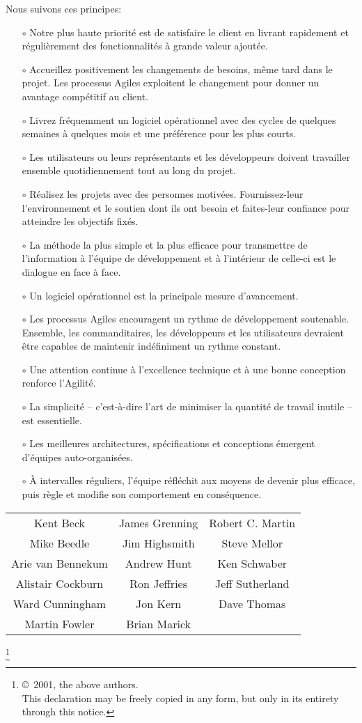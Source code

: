 \documentclass[11pt,a4paper]{article}
\newcommand\blfootnote[1]{%
  \begingroup
  \renewcommand\thefootnote{}\footnote{#1}%
  \addtocounter{footnote}{-1}%
  \endgroup
}
\begin{document}
Nous suivons ces principes:
\begin{itemize}
\item[$\circ$] Notre plus haute priorité est de satisfaire le client
en livrant rapidement et régulièrement des fonctionnalités
à grande valeur ajoutée.
\item[$\circ$] Accueillez positivement les changements de besoins,
même tard dans le projet. Les processus Agiles
exploitent le changement pour donner un avantage
compétitif au client.
\item[$\circ$] Livrez fréquemment un logiciel opérationnel avec des
cycles de quelques semaines à quelques mois et une
préférence pour les plus courts.
\item[$\circ$] Les utilisateurs ou leurs représentants et les
développeurs doivent travailler ensemble quotidiennement
tout au long du projet.
\item[$\circ$] Réalisez les projets avec des personnes motivées.
Fournissez-leur l’environnement et le soutien dont ils
ont besoin et faites-leur confiance pour atteindre les
objectifs fixés.
\item[$\circ$] La méthode la plus simple et la plus efficace pour
transmettre de l’information à l'équipe de développement
et à l’intérieur de celle-ci est le dialogue en face à face.
\item[$\circ$] Un logiciel opérationnel est la principale mesure d’avancement.
\item[$\circ$] Les processus Agiles encouragent un rythme de développement
soutenable. Ensemble, les commanditaires, les développeurs
et les utilisateurs devraient être capables de maintenir
indéfiniment un rythme constant.
\item[$\circ$] Une attention continue à l'excellence technique et
à une bonne conception renforce l’Agilité.
\item[$\circ$] La simplicité -- c’est-à-dire l’art de minimiser la
quantité de travail inutile -- est essentielle.
\item[$\circ$] Les meilleures architectures, spécifications et
conceptions émergent d'équipes auto-organisées.
\item[$\circ$] À intervalles réguliers, l'équipe réfléchit aux moyens
de devenir plus efficace, puis règle et modifie son
comportement en conséquence.
\end{itemize}


\vspace{5mm}


\begin{center}
\begin{tabular}{ccc}
Kent Beck & James Grenning & Robert C. Martin \\ 
Mike Beedle & Jim Highsmith & Steve Mellor \\ 
Arie van Bennekum & Andrew Hunt & Ken Schwaber \\ 
Alistair Cockburn & Ron Jeffries & Jeff Sutherland \\ 
Ward Cunningham & Jon Kern & Dave Thomas \\ 
Martin Fowler & Brian Marick & ~ \\ 
\end{tabular} 
\end{center}

\blfootnote{\copyright~2001, the above authors.\\This declaration may be freely copied in any form, but only in its entirety through this notice.}
\end{document}
